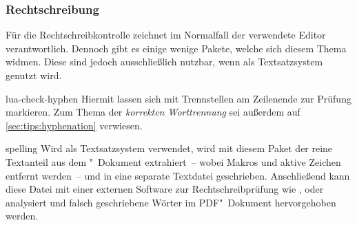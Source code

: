 \subsubsection{Rechtschreibung}
%
%
Für die Rechtschreibkontrolle zeichnet im Normalfall der verwendete Editor 
verantwortlich. Dennoch gibt es einige wenige Pakete, welche sich diesem Thema 
widmen. Diese sind jedoch ausschließlich nutzbar, wenn als Textsatzsystem 
 genutzt wird.
\begin{packages}
\item[lua-check-hyphen]
  Hiermit lassen sich mit  Trennstellen am Zeilenende zur 
  Prüfung markieren. Zum Thema der \textit{korrekten Worttrennung} sei außerdem 
  auf \autoref{sec:tips:hyphenation} verwiesen.
\item[spelling]
  Wird  als Textsatzsystem verwendet, wird mit diesem Paket 
  der reine Textanteil aus dem "~Dokument extrahiert~-- wobei 
  Makros und aktive Zeichen entfernt werden~-- und in eine separate Textdatei 
  geschrieben. Anschließend kann diese Datei mit einer externen Software zur  
  Rechtschreibprüfung wie ,  oder 
   analysiert und falsch geschriebene Wörter im 
  PDF"~Dokument hervorgehoben werden.
%
\end{packages}


